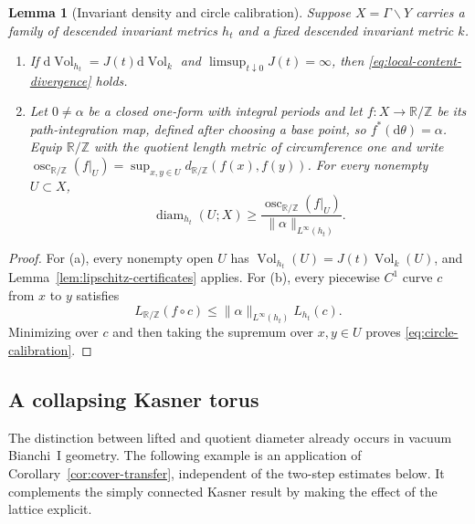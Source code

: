 \documentclass[10pt,a4paper]{article}
\numberwithin{equation}{section}
\newtheorem{lemma}[theorem]{Lemma}
\theoremstyle{definition}
\theoremstyle{remark}
\newcommand{\R}{\mathbb R}
\newcommand{\dd}{\mathrm d}
\newcommand{\diam}{\operatorname{diam}}
\newcommand{\Vol}{\operatorname{Vol}}
\begin{document}
\begin{lemma}[Invariant density and circle calibration]
\label{lem:quotient-tests}
Suppose $X=\Gamma\backslash Y$ carries a family of descended invariant
metrics $h_t$ and a fixed descended invariant metric $k$.

\begin{enumerate}[label=\textup{(\alph*)}]
\item If $\dd\Vol_{h_t}=J(t)\dd\Vol_k$ and
$\limsup_{t\downarrow0}J(t)=\infty$, then
\eqref{eq:local-content-divergence} holds.

\item Let $0\ne\alpha$ be a closed one-form with integral periods and let
$f:X\to\R/\mathbb Z$ be its path-integration map, defined after choosing
a base point, so $f^*(\dd\theta)=\alpha$.
Equip $\R/\mathbb Z$ with the quotient length metric of circumference one and
write
$\operatorname{osc}_{\R/\mathbb Z}(f|_U)
=\sup_{x,y\in U}d_{\R/\mathbb Z}(f(x),f(y))$.
For every nonempty $U\subset X$,
\begin{equation}
 \diam_{h_t}(U;X)\ge
 \frac{\operatorname{osc}_{\R/\mathbb Z}(f|_U)}
 {\|\alpha\|_{L^\infty(h_t)}}.
 \label{eq:circle-calibration}
\end{equation}
\end{enumerate}
\end{lemma}

\begin{proof}
For (a), every nonempty open $U$ has
$\Vol_{h_t}(U)=J(t)\Vol_k(U)$, and Lemma~\ref{lem:lipschitz-certificates}
applies.  For (b), every piecewise $C^1$ curve $c$ from $x$ to $y$ satisfies
\[
 L_{\R/\mathbb Z}(f\circ c)
 \le\|\alpha\|_{L^\infty(h_t)}L_{h_t}(c).
\]
Minimizing over $c$ and then taking the supremum over $x,y\in U$ proves
\eqref{eq:circle-calibration}.
\end{proof}

\subsection{A collapsing Kasner torus}
\label{subsec:irrational-kasner}

The distinction between lifted and quotient diameter already occurs in
vacuum Bianchi~I geometry.  The following example is an application of
Corollary~\ref{cor:cover-transfer}, independent of the two-step estimates
below.  It complements the simply connected Kasner result
\cite{Miethke2024} by making the effect of the lattice explicit.
\end{document}
